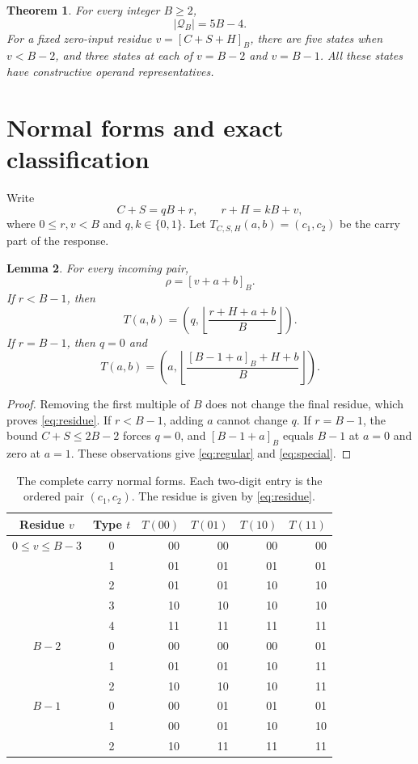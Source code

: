 \documentclass[11pt,a4paper]{article}
\newtheorem{theorem}{Theorem}
\newtheorem{lemma}[theorem]{Lemma}
\theoremstyle{definition}\newtheorem{definition}[theorem]{Definition}
\newcommand{\res}[1]{[#1]_B}
\newcommand{\Q}{\mathcal Q_B}
\begin{document}
\begin{theorem}\label{thm:count}
For every integer $B\geq2$,
\[
 |\Q|=5B-4.
\]
For a fixed zero-input residue $v=\res{C+S+H}$, there are five states
when $v<B-2$, and three states at each of $v=B-2$ and $v=B-1$.
All these states have constructive operand representatives.
\end{theorem}

\section{Normal forms and exact classification}
Write
\[
 C+S=qB+r,\qquad r+H=kB+v,
\]
where $0\leq r,v<B$ and $q,k\in\{0,1\}$. Let
$T_{C,S,H}(a,b)=(c_1,c_2)$ be the carry part of the response.

\begin{lemma}\label{lem:residue}
For every incoming pair,
\begin{equation}\label{eq:residue}
 \rho=\res{v+a+b}.
\end{equation}
If $r<B-1$, then
\begin{equation}\label{eq:regular}
 T(a,b)=\left(q,\left\lfloor\frac{r+H+a+b}{B}\right\rfloor\right).
\end{equation}
If $r=B-1$, then $q=0$ and
\begin{equation}\label{eq:special}
 T(a,b)=\left(a,\left\lfloor\frac{[B-1+a]_B+H+b}{B}\right\rfloor\right).
\end{equation}
\end{lemma}
\begin{proof}
Removing the first multiple of $B$ does not change the final residue,
which proves \eqref{eq:residue}. If $r<B-1$, adding $a$ cannot change
$q$. If $r=B-1$, the bound $C+S\leq2B-2$ forces $q=0$, and
$[B-1+a]_B$ equals $B-1$ at $a=0$ and zero at $a=1$.
These observations give \eqref{eq:regular} and \eqref{eq:special}.
\end{proof}

\begin{table}[ht]
\centering
\caption{The complete carry normal forms. Each two-digit entry is the
ordered pair $(c_1,c_2)$. The residue is given by \eqref{eq:residue}.}
\label{tab:forms}
\begin{tabular}{@{}ccrrrr@{}}
\toprule
Residue $v$ & Type $t$ & $T(00)$ & $T(01)$ & $T(10)$ & $T(11)$\\
\midrule
$0\leq v\leq B-3$ &0&00&00&00&00\\
 &1&01&01&01&01\\
 &2&01&01&10&10\\
 &3&10&10&10&10\\
 &4&11&11&11&11\\
\midrule
$B-2$&0&00&00&00&01\\
 &1&01&01&10&11\\
 &2&10&10&10&11\\
\midrule
$B-1$&0&00&01&01&01\\
 &1&00&01&10&10\\
 &2&10&11&11&11\\
\bottomrule
\end{tabular}
\end{table}
\end{document}
